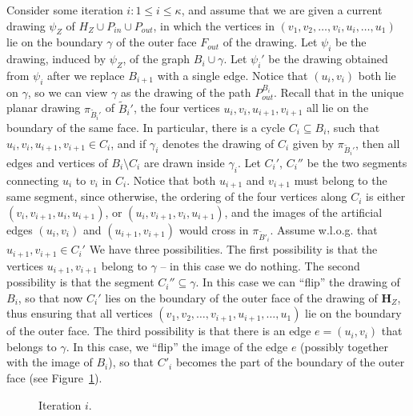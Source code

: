 \documentclass[twoside,leqno,twocolumn]{article}
\newcommand{\sse}{\subseteq}
\renewcommand{\H}{{\mathbf{H}}}
\begin{document}
Consider some iteration $i: 1\leq i\leq\kappa$, and assume that we are given a current drawing $\psi_Z$ of $H_Z\cup P_{in}\cup P_{out}$, in which the vertices in 
$(v_1,v_2,\ldots,v_{i},u_{i},\dots,u_1)$ lie on the boundary $\gamma$ of the outer face $F_{out}$ of the drawing. Let $\psi_i$ be the drawing, induced by $\psi_Z$, of the graph $B_i\cup \gamma$. Let $\psi_{i}'$ be the drawing obtained from $\psi_i$ after we replace $B_{i+1}$ with a single edge. Notice that $(u_i,v_i)$ both lie on $\gamma$, so we can view $\gamma$ as the drawing of the path $P_{out}^{B_i}$. Recall that in the unique planar drawing $\pi_{\tilde{B}_i'}$ of $\tilde{B}_i'$, the four vertices $u_i,v_i,u_{i+1},v_{i+1}$ all lie on the boundary of the same face. In particular, there is a cycle $C_i\sse B_i$, such that $u_i,v_i,u_{i+1},v_{i+1}\in C_i$, and if $\gamma_i$ denotes the drawing of $C_i$ given by $\pi_{\tilde{B}_i'}$, then all edges and vertices of $B_i\setminus C_i$ are drawn inside $\gamma_i$. Let $C_i'$, $C_i''$ be the two segments connecting $u_i$ to $v_i$ in $C_i$. Notice that both $u_{i+1}$ and $v_{i+1}$ must belong to the same segment, since otherwise, the ordering of the four vertices along $C_i$ is  either $(v_i,v_{i+1},u_{i},u_{i+1})$, or $(u_i,v_{i+1},v_{i},u_{i+1})$, and the images of the artificial edges $(u_i,v_i)$ and $(u_{i+1},v_{i+1})$ would cross in $\pi_{\tilde B'_i}$. Assume w.l.o.g. that $u_{i+1},v_{i+1}\in C_i'$
 We have three possibilities. The first possibility is that the vertices $u_{i+1},v_{i+1}$ belong to $\gamma$ -- in this case we do nothing. The second possibility is that the segment $C_i''\sse \gamma$. In this case we can ``flip'' the drawing of $B_i$, so that now $C_i'$ lies on the boundary of the outer face of the drawing of $\H_Z$, thus ensuring that all vertices  $(v_1,v_2,\ldots,v_{i+1},u_{i+1},\dots,u_1)$ lie on the boundary of the outer face.
The third possibility is that there is an edge $e=(u_i,v_i)$ that belongs to $\gamma$. In this case, we ``flip'' the image of the edge $e$ (possibly together with the image of $B_i$), so that $C'_i$ becomes the part of the boundary of the outer face (see Figure~\ref{fig: flipping one round}).

\begin{figure}
\begin{center}
\ifabstract
{}
\fi\iffull
{}
\fi
\caption{Iteration $i$.\label{fig: flipping one round}}
\end{center}
\end{figure}
\end{document}
